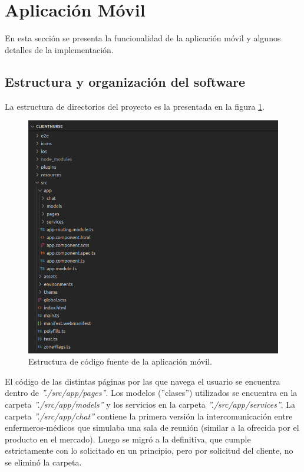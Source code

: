 \pagebreak
\section{Aplicación Móvil}
\label{Aplicación Móvil}
En esta sección se presenta la funcionalidad de la aplicación móvil y algunos detalles de la implementación.
\label{Estructura y organización del software}
\subsection{Estructura y organización del software}
La estructura de directorios del proyecto es la presentada en la figura \ref{fig: Estructura de código fuente de la aplicación móvil.}.

\begin{figure}[ht]
	\centering
	\includegraphics[scale=.60]{./Figures/app/estructura-app.png}
	\caption{ Estructura de código fuente de la aplicación móvil.}
	\label{fig: Estructura de código fuente de la aplicación móvil.}
\end{figure} 

El código de las distintas páginas por las que navega el usuario se encuentra dentro de \textit{''./src/app/pages''}. Los modelos (''clases'') utilizados se encuentra en la carpeta \textit{''./src/app/models''} y los servicios en la carpeta \textit{''./src/app/services''}. La carpeta \textit{''./src/app/chat''} contiene la primera versión la intercomunicación entre enfermeros-médicos que simulaba una sala de reunión  (similar a la ofrecida por el producto en el mercado). Luego se migró a la definitiva, que cumple estrictamente con lo solicitado en un principio, pero por solicitud del cliente, no se eliminó la carpeta.

